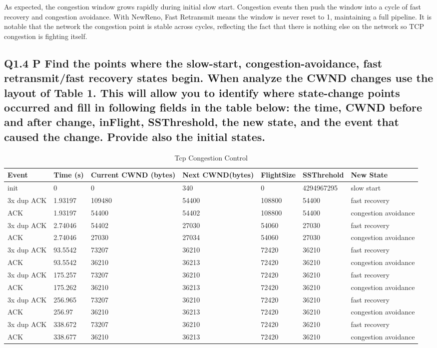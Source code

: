 \documentclass{article}
\begin{document}
As expected, the congestion window grows rapidly during initial slow start. Congestion events then push the window into a cycle of fast recovery and congestion avoidance. With NewReno, Fast Retransmit means the window is never reset to 1, maintaining a full pipeline. It is notable that the network the congestion point is stable across cycles, reflecting the fact that there is nothing else on the network so TCP congestion is fighting itself.

\subsection{Q1.4 P Find the points where the slow-start, congestion-avoidance, fast retransmit/fast recovery states begin. When analyze the CWND changes use the layout of Table 1. This will allow you to identify where state-change points occurred and fill in following fields in the table below: the time, CWND before and after change, inFlight, SSThreshold, the new state, and the event that caused the change. Provide also the initial states.}

\begin{table}[h]
\begin{tabular}{|l|l|l|l|l|l|l|}
\hline
Event           & Time (s)  & Current CWND (bytes) & Next CWND(bytes) & FlightSize & SSThrehold & New State  \\ \hline
init	& 0	        & 0	        & 340	& 0         & 4294967295    & slow start \\ \hline
3x dup ACK	& 1.93197	& 109480	& 54400	& 108800	& 54400	& fast recovery \\ \hline
ACK	& 1.93197	& 54400	& 54402	& 108800	& 54400	& congestion avoidance \\ \hline
3x dup ACK	& 2.74046	& 54402	& 27030	& 54060	& 27030	& fast recovery \\ \hline
ACK	& 2.74046	& 27030	& 27034	& 54060	& 27030	& congestion avoidance \\ \hline
3x dup ACK	& 93.5542	& 73207	& 36210	& 72420	& 36210	& fast recovery \\ \hline
ACK	& 93.5542	& 36210	& 36213	& 72420	& 36210	& congestion avoidance \\ \hline
3x dup ACK	& 175.257	& 73207	& 36210	& 72420	& 36210	& fast recovery \\ \hline
ACK	& 175.262	& 36210	& 36213	& 72420	& 36210	& congestion avoidance \\ \hline
3x dup ACK	& 256.965	& 73207	& 36210	& 72420	& 36210	& fast recovery \\ \hline
ACK	& 256.97	& 36210	& 36213	& 72420	& 36210	& congestion avoidance \\ \hline
3x dup ACK	& 338.672	& 73207	& 36210	& 72420	& 36210	& fast recovery \\ \hline
ACK	& 338.677	& 36210	& 36213	& 72420	& 36210	& congestion avoidance \\ \hline

\end{tabular}
\caption{Tcp Congestion Control}
\label{tab:scenario1}
\end{table}
\end{document}
